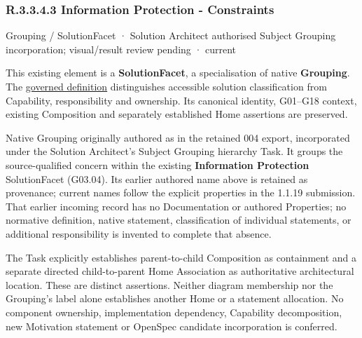 \subsubsection*{R.3.3.4.3 Information Protection - Constraints}
\label{navigation:R.3.3.4.3}

\label{element:a49c1e5afd224d12bae33fac366a1d37}
{\small Grouping / SolutionFacet · Solution Architect authorised Subject Grouping incorporation; visual/result review pending · current}\par

This existing element is a \textbf{SolutionFacet}, a specialisation of native
\textbf{Grouping}. The \href{\detokenize{../../../../../../../governance/continuum-representation.md#solutionfacet-classification--1119-candidate}}{governed definition}
distinguishes accessible solution classification from Capability, responsibility
and ownership. Its canonical identity, G01–G18 context, existing Composition
and separately established Home assertions are preserved.



Native Grouping originally authored as \texttt{} in the retained 004 export,
incorporated under the Solution Architect's Subject Grouping hierarchy Task.
It groups the source-qualified \texttt{} concern within
the existing \textbf{Information Protection} SolutionFacet (G03.04). Its earlier authored name above is retained as provenance; current names
follow the explicit properties in the 1.1.19 submission.
That earlier incoming record has no Documentation or authored Properties; no normative
definition, native statement, classification of individual statements, or
additional responsibility is invented to complete that absence.



The Task explicitly establishes parent-to-child Composition as containment and
a separate directed child-to-parent Home Association as authoritative architectural
location. These are distinct assertions. Neither diagram membership nor the
Grouping's label alone establishes another Home or a statement allocation.
No component ownership, implementation dependency, Capability decomposition,
new Motivation statement or OpenSpec candidate incorporation is conferred.



